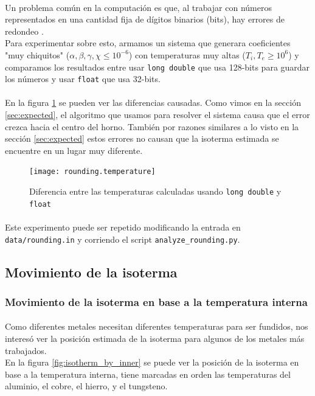 \documentclass[12pt]{article}
\begin{document}
\paragraph{} Un problema común en la computación es que, al trabajar con números representados en una cantidad fija de dígitos binarios (bits), hay errores de redondeo \cite{rounding}. \\ %
Para experimentar sobre esto, armamos un sistema que generara coeficientes "muy chiquitos" (\(\alpha, \beta, \gamma, \chi \leq 10^{-6}\)) con temperaturas muy altas (\(T_i, T_e \geq 10^6\)) y comparamos los resultados entre usar \texttt{long double} que usa 128-bits para guardar los números y usar \texttt{float} que usa 32-bits.
\paragraph{} En la figura \ref{fig:rounding.diffs} se pueden ver las diferencias causadas. Como vimos en la sección \ref{sec:expected}, el algoritmo que usamos para resolver el sistema causa que el error crezca hacia el centro del horno. También por razones similares a lo visto en la sección \ref{sec:expected} estos errores no causan que la isoterma estimada se encuentre en un lugar muy diferente.

\begin{figure}[H]
\centering
\texttt{[image: rounding.temperature]}
\caption{Diferencia entre las temperaturas calculadas usando \texttt{long double} y \texttt{float}}
\label{fig:rounding.diffs}
\end{figure}

\paragraph{} Este experimento puede ser repetido modificando la entrada en \texttt{data/rounding.in} y corriendo el script \texttt{analyze\_rounding.py}.

\subsection{Movimiento de la isoterma}

\subsubsection{Movimiento de la isoterma en base a la temperatura interna}

\paragraph{} Como diferentes metales necesitan diferentes temperaturas para ser fundidos, nos interesó ver la posición estimada de la isoterma para algunos de los metales más trabajados. \\ 
En la figura \ref{fig:isotherm_by_inner} se puede ver la posición de la isoterma en base a la temperatura interna, tiene marcadas en orden las temperaturas del aluminio, el cobre, el hierro, y el tungsteno. \cite{metales}
\end{document}
